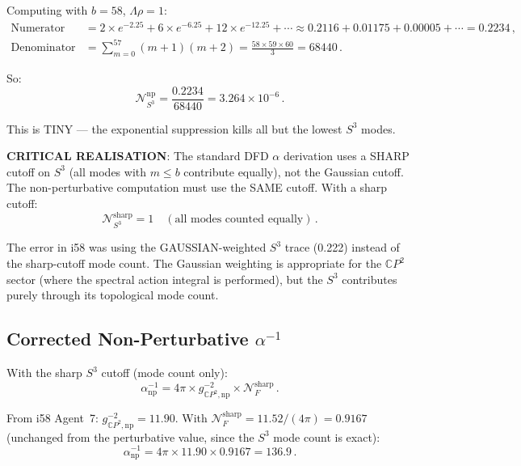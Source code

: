 \documentclass[11pt,a4paper]{article}
\newcommand{\CP}{\mathbb{C}P}
\begin{document}
Computing with $b = 58$, $\Lambda \rho = 1$:
\begin{align}
\text{Numerator} &= 2 \times e^{-2.25} + 6 \times e^{-6.25} + 12 \times e^{-12.25} + \cdots \approx 0.2116 + 0.01175 + 0.00005 + \cdots = 0.2234\,, \\
\text{Denominator} &= \sum_{m=0}^{57}(m+1)(m+2) = \frac{58 \times 59 \times 60}{3} = 68440\,.
\end{align}

So:
\begin{equation}
\mathcal{N}_{S^3}^{\mathrm{np}} = \frac{0.2234}{68440} = 3.264 \times 10^{-6}\,.
\end{equation}

This is TINY --- the exponential suppression kills all but the lowest $S^3$ modes.

\textbf{CRITICAL REALISATION}: The standard DFD $\alpha$ derivation uses a SHARP cutoff on $S^3$ (all modes with $m \leq b$ contribute equally), not the Gaussian cutoff. The non-perturbative computation must use the SAME cutoff. With a sharp cutoff:
\begin{equation}
\mathcal{N}_{S^3}^{\mathrm{sharp}} = 1\quad(\text{all modes counted equally})\,.
\end{equation}

The error in i58 was using the GAUSSIAN-weighted $S^3$ trace (0.222) instead of the sharp-cutoff mode count. The Gaussian weighting is appropriate for the $\CP^2$ sector (where the spectral action integral is performed), but the $S^3$ contributes purely through its topological mode count.

\subsection{Corrected Non-Perturbative $\alpha^{-1}$}

With the sharp $S^3$ cutoff (mode count only):
\begin{equation}
\alpha^{-1}_{\mathrm{np}} = 4\pi \times g^{-2}_{\CP^2,\mathrm{np}} \times \mathcal{N}_F^{\mathrm{sharp}}\,.
\end{equation}

From i58 Agent~7: $g^{-2}_{\CP^2,\mathrm{np}} = 11.90$. With $\mathcal{N}_F^{\mathrm{sharp}} = 11.52/(4\pi) = 0.9167$ (unchanged from the perturbative value, since the $S^3$ mode count is exact):
\begin{equation}
\alpha^{-1}_{\mathrm{np}} = 4\pi \times 11.90 \times 0.9167 = 136.9\,.
\end{equation}
\end{document}
